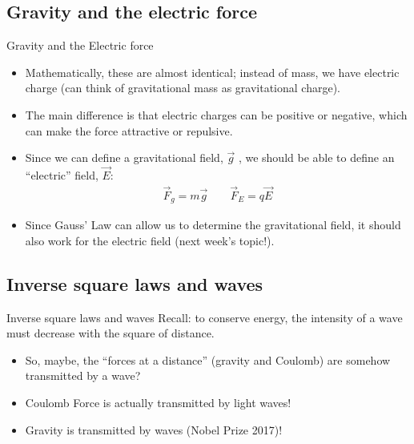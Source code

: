 \documentclass[aspectratio=169,
hyperref={colorlinks,urlcolor=blue}
]{beamer}
\begin{document}
\subsection{Gravity and the electric force}
\label{subsec:gravityandtheelectricforce}
\begin{frame}{Gravity and the Electric force}
\begin{itemize}
\item Mathematically, these are almost identical; instead of mass, we have electric charge (can think of gravitational mass as gravitational charge).
\item The main difference is that electric charges can be positive or negative, which can make the force attractive or repulsive.
\item Since we can define a gravitational field, $\vec g$ , we should be able to define an ``electric'' field, $\vec E$:
\begin{align*}
\vec F_g = m\vec g \quad\quad \vec F_E=q\vec E
\end{align*}
\item Since Gauss' Law can allow us to determine the gravitational field, it should also work for the electric field (next week's topic!).

\end{itemize}
\end{frame}


\subsection{Inverse square laws and waves}
\label{subsec:inversesquarelawsandwaves}
\begin{frame}{Inverse square laws and waves}
Recall: to conserve energy, the intensity of a wave must decrease with the square of distance.
\begin{itemize}
\item So, maybe, the ``forces at a distance'' (gravity and Coulomb) are somehow transmitted by a wave?
\item Coulomb Force is actually transmitted by light waves!
\item Gravity is transmitted by waves (Nobel Prize 2017)!
\end{itemize}
\end{frame}






\end{document}
